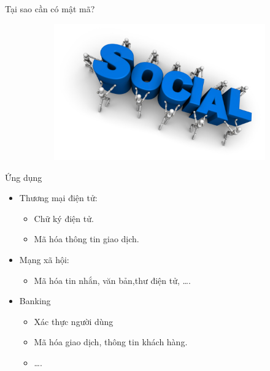 \documentclass[compress]{beamer}
\begin{document}
\begin{frame}{Tại sao cần có mật mã?}
\begin{figure}[h]
\begin{subfigure}{.35\textwidth}
\end{subfigure}
\begin{subfigure}{.35\textwidth}
  \centering
  \includegraphics[width=1\linewidth]{../soical.jpeg}
  \label{fig:sfig2}
\end{subfigure}
\label{fig:fig}
\end{figure}
\end{frame}
\begin{frame}{Ứng dụng}
\begin{itemize}
\item Thương mại điện tử:
\begin{itemize}
\item Chữ ký điện tử.
\item Mã hóa thông tin giao dịch.
\end{itemize}
\item Mạng xã hội:
\begin{itemize}
\item Mã hóa tin nhắn, văn bản,thư điện tử, \ldots .
\end{itemize}
\item Banking
\begin{itemize}
\item Xác thực người dùng
\item Mã hóa giao dịch, thông tin khách hàng.
\item \ldots.
\end{itemize}
\end{itemize}
\end{frame}
\end{document}
